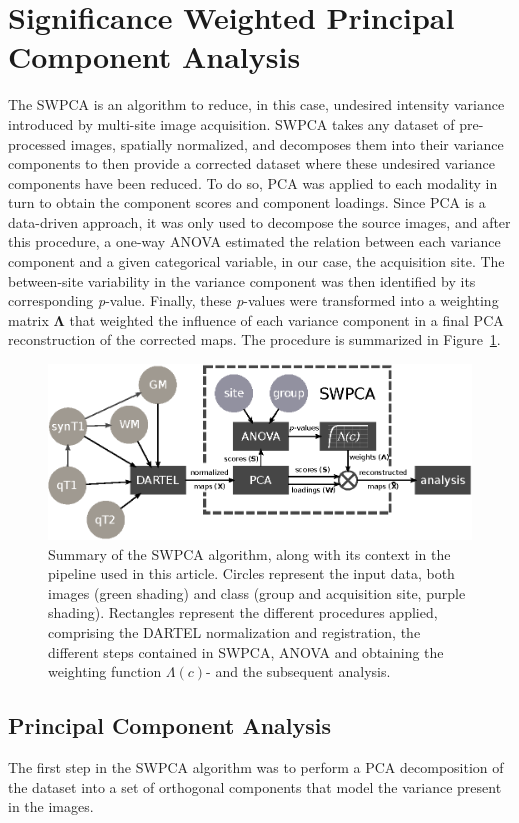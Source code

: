 \cite{Martinez-Murcia2016a}

\section{Significance Weighted Principal Component Analysis}
The \acf{SWPCA} is an algorithm to reduce, in this case, undesired intensity variance introduced by multi-site image acquisition. \ac{SWPCA} takes any dataset of pre-processed images, spatially normalized, and decomposes them into their variance components to then provide a corrected dataset where these undesired variance components have been reduced. To do so, \ac{PCA} was applied to each modality in turn to obtain the component scores and component loadings. Since \ac{PCA} is a data-driven approach, it was only used to decompose the source images, and after this procedure, a one-way \ac{ANOVA} estimated the relation between each variance component and a given categorical variable, in our case, the acquisition site. The between-site variability in the variance component was then identified by its corresponding \textit{p}-value. Finally, these \textit{p}-values were transformed into a weighting matrix  $\boldsymbol\Lambda$ that weighted the influence of each variance component in a final \ac{PCA} reconstruction of the corrected maps. The procedure is summarized in Figure~\ref{fig:swpcaschema}. 

\begin{figure}
\centering
\includegraphics[width=0.7\linewidth]{gfx/ch8/FIGURE01}
\caption{Summary of the \ac{SWPCA} algorithm, along with its context in the pipeline used in this article. Circles represent the input data, both images (green shading) and class (group and acquisition site, purple shading). Rectangles represent the different procedures applied, comprising the DARTEL normalization and registration, the different steps contained in \ac{SWPCA}, \ac{ANOVA} and obtaining the weighting function $\Lambda(c)$- and the subsequent analysis.}
\label{fig:swpcaschema}
\end{figure}


\subsection{Principal Component Analysis}\label{sec:pca}
The first step in the \ac{SWPCA} algorithm was to perform a \ac{PCA} decomposition
of the dataset into a set of orthogonal components that model the
variance present in the images. 


